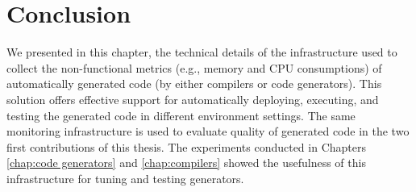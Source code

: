 \section{Conclusion}
\label{mon:coclusion}
We presented in this chapter, the technical details of the infrastructure used to collect the non-functional metrics (e.g., memory and CPU consumptions) of automatically generated code (by either compilers or code generators). This solution offers effective support for automatically deploying, executing, and testing the generated code in different environment settings.
The same monitoring infrastructure is used to evaluate quality of generated code in the two first contributions of this thesis. The experiments conducted in Chapters \ref{chap:code generators} and \ref{chap:compilers} showed the usefulness of this infrastructure for tuning and testing generators. 